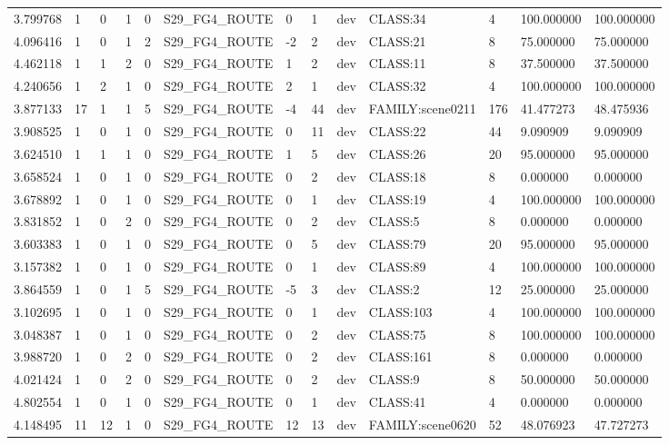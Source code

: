 \begin{tabular}{lllllllllllll}
3.799768 & 1 & 0 & 1 & 0 & S29\_FG4\_ROUTE & 0 & 1 & dev & CLASS:34 & 4 & 100.000000 & 100.000000 \\
4.096416 & 1 & 0 & 1 & 2 & S29\_FG4\_ROUTE & -2 & 2 & dev & CLASS:21 & 8 & 75.000000 & 75.000000 \\
4.462118 & 1 & 1 & 2 & 0 & S29\_FG4\_ROUTE & 1 & 2 & dev & CLASS:11 & 8 & 37.500000 & 37.500000 \\
4.240656 & 1 & 2 & 1 & 0 & S29\_FG4\_ROUTE & 2 & 1 & dev & CLASS:32 & 4 & 100.000000 & 100.000000 \\
3.877133 & 17 & 1 & 1 & 5 & S29\_FG4\_ROUTE & -4 & 44 & dev & FAMILY:scene0211 & 176 & 41.477273 & 48.475936 \\
3.908525 & 1 & 0 & 1 & 0 & S29\_FG4\_ROUTE & 0 & 11 & dev & CLASS:22 & 44 & 9.090909 & 9.090909 \\
3.624510 & 1 & 1 & 1 & 0 & S29\_FG4\_ROUTE & 1 & 5 & dev & CLASS:26 & 20 & 95.000000 & 95.000000 \\
3.658524 & 1 & 0 & 1 & 0 & S29\_FG4\_ROUTE & 0 & 2 & dev & CLASS:18 & 8 & 0.000000 & 0.000000 \\
3.678892 & 1 & 0 & 1 & 0 & S29\_FG4\_ROUTE & 0 & 1 & dev & CLASS:19 & 4 & 100.000000 & 100.000000 \\
3.831852 & 1 & 0 & 2 & 0 & S29\_FG4\_ROUTE & 0 & 2 & dev & CLASS:5 & 8 & 0.000000 & 0.000000 \\
3.603383 & 1 & 0 & 1 & 0 & S29\_FG4\_ROUTE & 0 & 5 & dev & CLASS:79 & 20 & 95.000000 & 95.000000 \\
3.157382 & 1 & 0 & 1 & 0 & S29\_FG4\_ROUTE & 0 & 1 & dev & CLASS:89 & 4 & 100.000000 & 100.000000 \\
3.864559 & 1 & 0 & 1 & 5 & S29\_FG4\_ROUTE & -5 & 3 & dev & CLASS:2 & 12 & 25.000000 & 25.000000 \\
3.102695 & 1 & 0 & 1 & 0 & S29\_FG4\_ROUTE & 0 & 1 & dev & CLASS:103 & 4 & 100.000000 & 100.000000 \\
3.048387 & 1 & 0 & 1 & 0 & S29\_FG4\_ROUTE & 0 & 2 & dev & CLASS:75 & 8 & 100.000000 & 100.000000 \\
3.988720 & 1 & 0 & 2 & 0 & S29\_FG4\_ROUTE & 0 & 2 & dev & CLASS:161 & 8 & 0.000000 & 0.000000 \\
4.021424 & 1 & 0 & 2 & 0 & S29\_FG4\_ROUTE & 0 & 2 & dev & CLASS:9 & 8 & 50.000000 & 50.000000 \\
4.802554 & 1 & 0 & 1 & 0 & S29\_FG4\_ROUTE & 0 & 1 & dev & CLASS:41 & 4 & 0.000000 & 0.000000 \\
4.148495 & 11 & 12 & 1 & 0 & S29\_FG4\_ROUTE & 12 & 13 & dev & FAMILY:scene0620 & 52 & 48.076923 & 47.727273 \\

\end{tabular}
